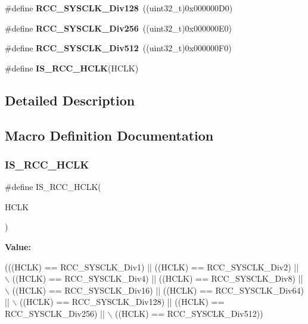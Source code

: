 \begin{DoxyCompactItemize}
\mbox{\label{group___r_c_c___a_h_b___clock___source_ga1a28926fcb86112058a365e01fe9a46b}} 
\#define {\bfseries R\+C\+C\+\_\+\+S\+Y\+S\+C\+L\+K\+\_\+\+Div128}~((uint32\+\_\+t)0x000000\+D0)
\item 
\mbox{\label{group___r_c_c___a_h_b___clock___source_gaa28bb876893b3267a813fc98a462d5ee}} 
\#define {\bfseries R\+C\+C\+\_\+\+S\+Y\+S\+C\+L\+K\+\_\+\+Div256}~((uint32\+\_\+t)0x000000\+E0)
\item 
\mbox{\label{group___r_c_c___a_h_b___clock___source_gab5b4588c455d6327bc96f131ed6698ab}} 
\#define {\bfseries R\+C\+C\+\_\+\+S\+Y\+S\+C\+L\+K\+\_\+\+Div512}~((uint32\+\_\+t)0x000000\+F0)
\item 
\#define {\bfseries I\+S\+\_\+\+R\+C\+C\+\_\+\+H\+C\+LK}(H\+C\+LK)
\end{DoxyCompactItemize}


\subsection{Detailed Description}


\subsection{Macro Definition Documentation}
\mbox{\label{group___r_c_c___a_h_b___clock___source_ga6e9f1c193a2f41bcb3c2f7fa8459b5b3}} 
\subsubsection{\texorpdfstring{I\+S\+\_\+\+R\+C\+C\+\_\+\+H\+C\+LK}{IS\_RCC\_HCLK}}
{\footnotesize\ttfamily \#define I\+S\+\_\+\+R\+C\+C\+\_\+\+H\+C\+LK(\begin{DoxyParamCaption}\item[{}]{H\+C\+LK }\end{DoxyParamCaption})}

{\bfseries Value\+:}
\begin{DoxyCode}
(((HCLK) == RCC\_SYSCLK\_Div1) || ((HCLK) == RCC\_SYSCLK\_Div2) || \(\backslash\)
                           ((HCLK) == RCC\_SYSCLK\_Div4) || ((HCLK) == RCC\_SYSCLK\_Div8) || \(\backslash\)
                           ((HCLK) == RCC\_SYSCLK\_Div16) || ((HCLK) == RCC\_SYSCLK\_Div64) || \(\backslash\)
                           ((HCLK) == RCC\_SYSCLK\_Div128) || ((HCLK) == RCC\_SYSCLK\_Div256) || \(\backslash\)
                           ((HCLK) == RCC\_SYSCLK\_Div512))
\end{DoxyCode}
